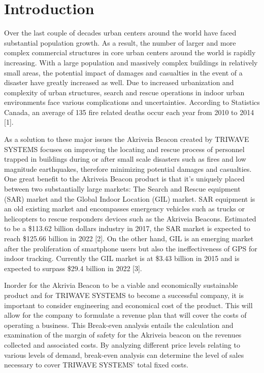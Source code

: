 

\setcounter{section}{0}
\section{Introduction}

\bigskip
Over the last couple of decades urban centers around the world have faced substantial population growth. As a result, the number of larger and more complex commercial structures in core urban centers around the world is rapidly increasing. With a large population and massively complex buildings in relatively small areas, the potential impact of damages and casualties in the event of a disaster have greatly increased as well. Due to increased urbanization and complexity of urban structures, search and rescue operations in indoor urban environments face various complications and uncertainties. According to Statistics Canada, an average of 135 fire related deaths occur each year from 2010 to 2014 [1]. 

\bigskip
As a solution to these major issues the Akriveia Beacon created by TRIWAVE SYSTEMS focuses on improving the locating and rescue process of personnel trapped in buildings during or after small scale disasters such as fires and low magnitude earthquakes, therefore minimizing potential damages and casualties. One great benefit to the Akriveia Beacon product is that it’s uniquely placed between two substantially large markets: The Search and Rescue equipment (SAR) market and the Global Indoor Location (GIL) market. SAR equipment is an old existing market and encompasses emergency vehicles such as trucks or helicopters to rescue responders devices such as the Akriveia Beacons. Estimated to be a \$113.62 billion dollars industry in 2017, the SAR market is expected to reach \$125.66 billion in 2022 [2]. On the other hand, GIL is an emerging market after the proliferation of smartphone users but also the ineffectiveness of GPS for indoor tracking. Currently the GIL market is at \$3.43 billion in 2015 and is expected to surpass \$29.4 billion in 2022 [3]. 

\bigskip
Inorder for the Akrivia Beacon to be a viable and economically sustainable product and for TRIWAVE SYSTEMS to become a successful company, it is important to consider engineering and economical cost of the product.  This will allow for the company to formulate a revenue plan that will cover the costs of operating a business. This Break-even analysis entails the calculation and examination of the margin of safety for the Akriveia beacon on the revenues collected and associated costs. By analyzing different price levels relating to various levels of demand, break-even analysis can determine the level of sales necessary to cover TRIWAVE SYSTEMS’ total fixed costs.
